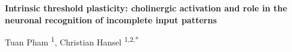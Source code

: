 \begin{center}
    {
    \noindent
    \selectfont
    \Large
        \textbf{
            Intrinsic threshold plasticity: cholinergic activation and role in the neuronal recognition of incomplete input patterns
        }
    }
\end{center}

\begin{center}
    Tuan Pham \textsuperscript{1},
    Christian Hansel \textsuperscript{1,2,*}
\end{center}
